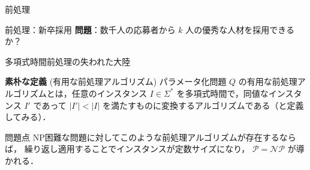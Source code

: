 \documentclass[
  aspectratio=169,
]{beamer}
\begin{document}
\begin{frame}{前処理}
\begin{figure}

	\end{figure}

\end{frame}

\begin{frame}{前処理：新卒採用}
	\textbf{問題}：数千人の応募者から \(k\) 人の優秀な人材を採用できるか？
\end{frame}

\begin{frame}{多項式時間前処理の失われた大陸}

	\begin{block}{\textbf{素朴な定義} (有用な前処理アルゴリズム)}
		パラメータ化問題 \(Q\) の\alert{有用な前処理アルゴリズム}とは，任意のインスタンス \(I \in \Sigma^*\) を多項式時間で，同値なインスタンス \(I'\) であって \(|I'| < |I|\) を満たすものに変換するアルゴリズムである（と定義してみる）．
	\end{block}

	\begin{alertblock}{問題点}
		NP困難な問題に対してこのような前処理アルゴリズムが存在するならば，
		繰り返し適用することでインスタンスが定数サイズになり，
		$\mathcal{P} = \mathcal{NP}$ が導かれる．
	\end{alertblock}

\end{frame}
\end{document}
